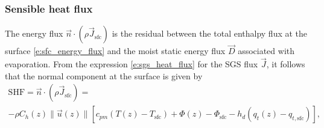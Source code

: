 \documentclass{report}
\begin{document}
\subsubsection{Sensible heat flux} The energy flux $\vec{n} \cdot (\rho \vec{J}_{\mathrm{sfc}})$ is the residual between the total enthalpy flux at the surface \eqref{e:sfc_energy_flux} and the moist static energy flux $\vec{D}$ associated with evaporation. From the expression \eqref{e:sgs_heat_flux} for the SGS flux $\vec{J}$, it follows that the normal component at the surface is given by 
\begin{multline}\label{e:sfc_SHF}
    \mathrm{SHF} = \vec{n} \cdot (\rho \vec{J}_{\mathrm{sfc}}) =
    \\ -\rho C_h(z) \| \vec{u}(z) \| \left[ c_{pm} (T(z) - T_\mathrm{sfc}) + \Phi(z) - \Phi_\mathrm{sfc}
    - h_d (q_t(z) - q_{t, \mathrm{sfc}})  \right],
\end{multline}
\end{document}
